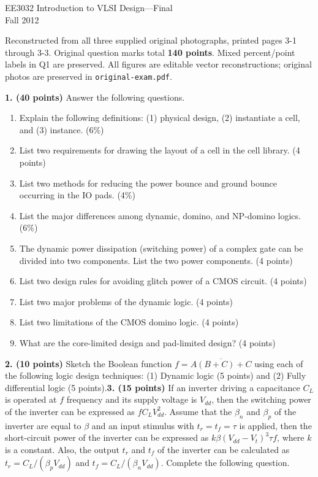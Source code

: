 \documentclass[10pt]{article}
\begin{document}
\begin{center}{\Large EE3032 Introduction to VLSI Design---Final}\\Fall 2012\end{center}
Reconstructed from all three supplied original photographs, printed pages 3-1 through 3-3. Original question marks total \textbf{140 points}. Mixed percent/point labels in Q1 are preserved. All figures are editable vector reconstructions; original photos are preserved in \texttt{original-exam.pdf}.\par\medskip
\textbf{1. (40 points)} Answer the following questions.
\begin{enumerate}[label=(\alph*)]
\item Explain the following definitions: (1) physical design, (2) instantiate a cell, and (3) instance. (6\%)
\item List two requirements for drawing the layout of a cell in the cell library. (4 points)
\item List two methods for reducing the power bounce and ground bounce occurring in the IO pads. (4\%)
\item List the major differences among dynamic, domino, and NP-domino logics. (6\%)
\item The dynamic power dissipation (switching power) of a complex gate can be divided into two components. List the two power components. (4 points)
\item List two design rules for avoiding glitch power of a CMOS circuit. (4 points)
\item List two major problems of the dynamic logic. (4 points)
\item List two limitations of the CMOS domino logic. (4 points)
\item What are the core-limited design and pad-limited design? (4 points)
\end{enumerate}\textbf{2. (10 points)} Sketch the Boolean function $f=\overline{A(B+C)+C}$ using each of the following logic design techniques: (1) Dynamic logic (5 points) and (2) Fully differential logic (5 points).\newpage\textbf{3. (15 points)} If an inverter driving a capacitance $C_L$ is operated at $f$ frequency and its supply voltage is $V_{dd}$, then the switching power of the inverter can be expressed as $fC_LV_{dd}^2$. Assume that the $\beta_n$ and $\beta_p$ of the inverter are equal to $\beta$ and an input stimulus with $t_r=t_f=\tau$ is applied, then the short-circuit power of the inverter can be expressed as $k\beta(V_{dd}-V_t)^3\tau f$, where $k$ is a constant. Also, the output $t_r$ and $t_f$ of the inverter can be calculated as $t_r=C_L/(\beta_pV_{dd})$ and $t_f=C_L/(\beta_nV_{dd})$. Complete the following question.
\end{document}
